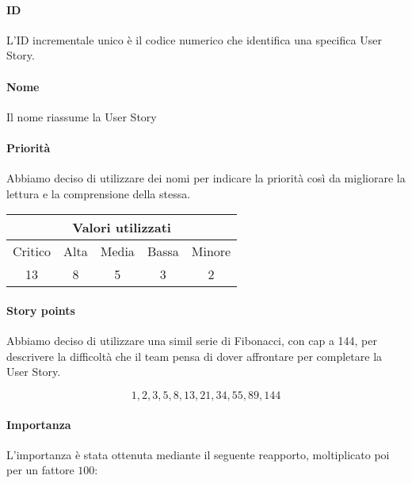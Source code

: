 \vspace{-0.5cm}

\paragraph{ID} L'ID incrementale unico è il codice numerico che identifica una specifica User Story.

\paragraph{Nome} Il nome riassume la User Story

\paragraph{Priorità} Abbiamo deciso di utilizzare dei nomi per indicare la priorità così da migliorare la lettura e la comprensione della stessa.

\begin{table}[h!]
    \centering
    \begin{tabular}{c|c|c|c|c}
        \hline
        \multicolumn{5}{c}{Valori utilizzati}\\
        \hline
        Critico & Alta  & Media & Bassa & Minore\\
        13 & 8  & 5 & 3 & 2\\
    \end{tabular}
\end{table}


\paragraph{Story points} Abbiamo deciso di utilizzare una simil serie di Fibonacci, con cap a 144, per descrivere la difficoltà che il team pensa di dover affrontare per completare la User Story.

\begin{equation*}
1, 2, 3, 5, 8, 13, 21, 34, 55, 89, 144
\end{equation*}


\paragraph{Importanza}

L'importanza è stata ottenuta mediante il seguente reapporto, moltiplicato poi per un fattore $100$:

